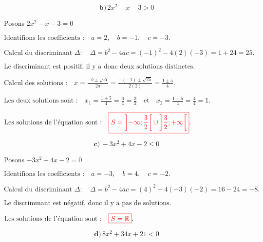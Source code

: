 \documentclass[12pt,a4paper]{article}
\begin{document}
\[
\textbf{b)} \, 2x^2 - x - 3 > 0
\]

Posons \( 2x^2 - x - 3 = 0 \)

\(
\text{Identifions les coefficients :} \quad a = 2, \quad b = -1, \quad c = -3.
\)

\(
\text{Calcul du discriminant } \Delta : \quad
\Delta = b^2 - 4ac = (-1)^2 - 4(2)(-3) = 1 + 24  = 25.
\)

\(
\text{Le discriminant est positif, il y a donc deux solutions distinctes.}
\)

\(
\text{Calcul des solutions :} \quad
x = \frac{-b \pm \sqrt{\Delta}}{2a} = \frac{-(-1) \pm \sqrt{25}}{2(2)} = \frac{1 \pm 5}{4}.
\)

\(
\text{Les deux solutions sont :} \quad
x_1 = \frac{1 + 5}{4} = \frac{6}{4} = \frac{3}{2} \quad \text{et} \quad x_2 = \frac{1 - 5}{4} = \frac{4}{4} = 1.
\)


\(
\text{Les solutions de l'équation sont :} \quad
\textcolor{red}{\boxed{S=\left]-\infty;\frac{3}{2} \right[ \cup\left] \frac{3}{2};+\infty \right[ }}.
\)

\[ \textbf{c)} \, -3x^2 + 4x - 2 \leq 0 \]

Posons \( -3x^2 + 4x - 2 = 0 \)

\(
\text{Identifions les coefficients :} \quad a = -3, \quad b = 4, \quad c = -2.
\)

\(
\text{Calcul du discriminant } \Delta : \quad
\Delta = b^2 - 4ac = (4)^2 - 4(-3)(-2) = 16 - 24  = -8.
\)

\(
\text{Le discriminant est négatif, donc il y a pas de solutions.}
\)


\(
\text{Les solutions de l'équation sont :} \quad
\textcolor{red}{\boxed{S=\mathbb{R} }}.
\)

\[
\textbf{d)} \, 8x^2 + 34x + 21 < 0
\]
\end{document}
